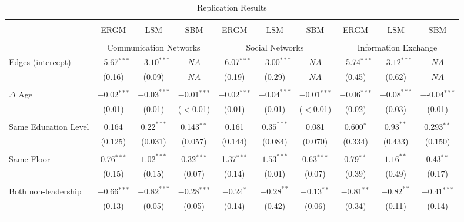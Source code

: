 \documentclass[fleqn,12pt]{wlscirep}
\begin{document}
\begin{landscape}
\begin{table}[!htbp] \centering
\caption{Replication Results}
\label{table:coefficients}
\begin{tabular}{lccccccccc}
\\[-1.8ex]\hline
\hline \\[-1.8ex]
 & ERGM & LSM & SBM  & ERGM & LSM & SBM & ERGM & LSM & SBM\\
\hline \\[-1.8ex]
 &  \multicolumn{3}{c}{Communication Networks} &  
 \multicolumn{3}{c}{Social Networks}&  
 \multicolumn{3}{c}{Information Exchange}\\
\hline
Edges (intercept)   & $-$5.67$^{***}$ &$-3.10^{***}$ & $NA$ & 
$-$6.07$^{***}$ &$-3.00^{***}$& $NA$ & 
$-$5.74$^{***}$ &   $-3.12^{***}$  & $NA$  
\\ 
& (0.16) & (0.09) & $NA$ &(0.19) & (0.29) &  $NA$ &(0.45) & (0.62)& $NA$
 \\ 
  & & & \\ 
$\Delta$ Age & $-$0.02$^{***}$ & $-0.03^{***}$  & $-$0.01$^{***}$ &
$-$0.02$^{***}$ & $-0.04^{***}$    &$-$0.01$^{***}$ &
 $-$0.06$^{***}$ & $-0.08^{***}$  &   $-$-0.04$^{***}$ \\
  & (0.01)   & (0.01) & ($<$0.01) &
  (0.01) & (0.01) &  ($<$0.01) &
  (0.02)& (0.03)  &(0.01)\\ 
  & & & \\ 
Same Education Level & 0.164 & $0.22^{***}$ & 0.143$^{**}$&
0.161 & $0.35^{***}$ & 0.081 &
0.600$^{*}$ &  $0.93^{**}$ & 0.293$^{**}$ \\ 
  & (0.125) &(0.031) & (0.057) &
  (0.144) & (0.084) &  (0.070) &
  (0.334) &(0.433)&(0.150)\\ 
  & & & \\ 
Same Floor & 0.76$^{***}$ & $1.02^{***}$  & 0.32$^{***}$ & 
1.37$^{***}$      & $1.53^{***}$   &   0.63$^{***}$   &
0.79$^{**}$ & $1.16^{**}$  & 0.43$^{**}$ \\ 
  & (0.15)  & (0.15) & (0.07) &
  (0.14) & (0.01) &  (0.07) & 
  (0.39)& (0.49) &(0.17) \\ 
  & & & \\ 
Both non-leadership & $-$0.66$^{***}$ &   $-0.82^{***}$   & $-$0.28$^{***}$ &           
$-$0.24$^{*}$ &$-0.28^{**}$& $-$0.13$^{**}$& 
$-$0.81$^{**}$ & $-0.82^{**}$  & $-$0.41$^{***}$\\
  & (0.13) & (0.05) & (0.05) & (0.14) &  (0.42) & (0.06)&(0.34)   & (0.11)& (0.14)\\ 
  & & & \\ 

\end{tabular}
\end{table}
\end{landscape}
\end{document}
